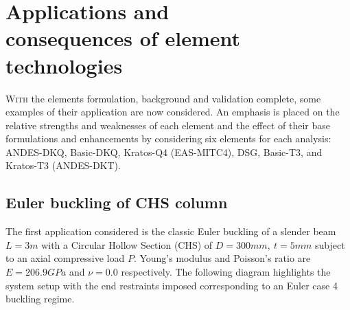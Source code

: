 



\chapter[Applications and consequences of element technologies]{Applications and \\ consequences of element \\ technologies}
\label{chap:chapter_application}

\renewcommand{\Thema}{Applications and consequences of element technologies}

\lettrine[lines=2]{W}{ith} the elements formulation, background and validation complete, some examples of their application are now considered. An emphasis is placed on the relative strengths and weaknesses of each element and the effect of their base formulations and enhancements by considering six elements for each analysis: ANDES-DKQ, Basic-DKQ, Kratos-Q4 (EAS-MITC4), DSG, Basic-T3, and Kratos-T3 (ANDES-DKT).

\section{Euler buckling of CHS column}
\label{applications: Euler buckling of CHS column}
The first application considered is the classic Euler buckling of a slender beam $L=3m$ with a Circular Hollow Section (CHS) of $D = 300mm,\ t = 5mm$ subject to an axial compressive load $P$. Young's modulus and Poisson's ratio are $E = 206.9GPa$ and $\nu = 0.0$ respectively. The following diagram highlights the system setup with the end restraints imposed corresponding to an Euler case 4 buckling regime. 

